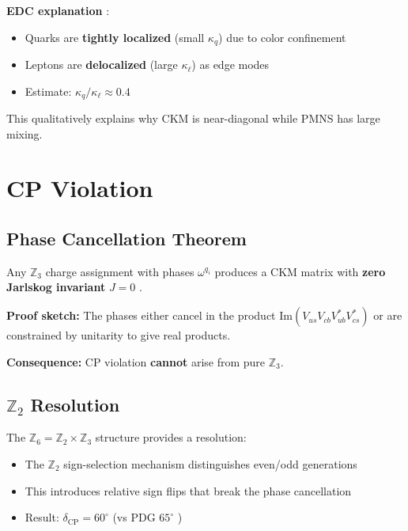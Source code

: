 \textbf{EDC explanation} \tagI{}:
\begin{itemize}[nosep]
    \item Quarks are \textbf{tightly localized} (small $\kappa_q$) due to color confinement
    \item Leptons are \textbf{delocalized} (large $\kappa_\ell$) as edge modes
    \item Estimate: $\kappa_q/\kappa_\ell \approx 0.4$
\end{itemize}

This qualitatively explains why CKM is near-diagonal while PMNS has large mixing.

\section{CP Violation}
\label{sec:cp_violation}

\subsection{Phase Cancellation Theorem}

\begin{tcolorbox}[colback=yellow!5!white, colframe=yellow!50!black,
    title=\textbf{Theorem: Pure $\mathbb{Z}_3$ Gives $J = 0$}]
Any $\mathbb{Z}_3$ charge assignment with phases $\omega^{q_i}$ produces
a CKM matrix with \textbf{zero Jarlskog invariant} $J = 0$ \tagDc{}.

\textbf{Proof sketch:} The phases either cancel in the product
$\text{Im}(V_{us}V_{cb}V_{ub}^*V_{cs}^*)$ or are constrained by unitarity
to give real products.

\textbf{Consequence:} CP violation \textbf{cannot} arise from pure $\mathbb{Z}_3$.
\end{tcolorbox}

\subsection{$\mathbb{Z}_2$ Resolution}

The $\mathbb{Z}_6 = \mathbb{Z}_2 \times \mathbb{Z}_3$ structure provides a resolution:
\begin{itemize}[nosep]
    \item The $\mathbb{Z}_2$ sign-selection mechanism distinguishes even/odd generations
    \item This introduces relative sign flips that break the phase cancellation
    \item Result: $\delta_{\text{CP}} = 60^\circ$ \tagDc{} (vs PDG $65^\circ$ \tagBL{})
\end{itemize}


